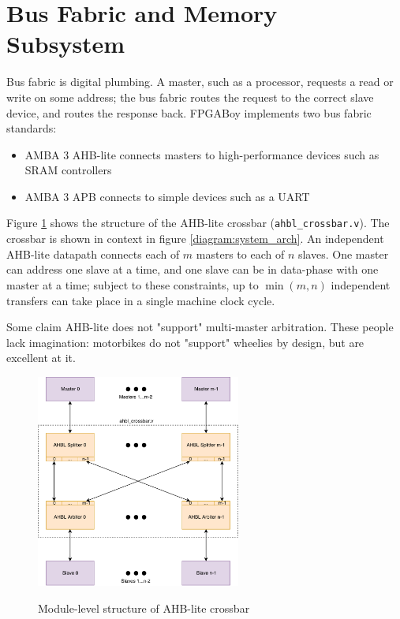 \documentclass{article}
\begin{document}
\section{Bus Fabric and Memory Subsystem}

Bus fabric is digital plumbing. A master, such as a processor, requests a read or write on some address; the bus fabric routes the request to the correct slave device, and routes the response back. FPGABoy implements two bus fabric standards:

\begin{itemize}
\item AMBA 3 AHB-lite connects masters to high-performance devices such as SRAM controllers
\item AMBA 3 APB connects to simple devices such as a UART
\end{itemize}

Figure \ref{diagram:crossbar_structure} shows the structure of the AHB-lite crossbar (\texttt{ahbl\_crossbar.v}). The crossbar is shown in context in figure \ref{diagram:system_arch}. An independent AHB-lite datapath connects each of $m$ masters to each of $n$ slaves. One master can address one slave at a time, and one slave can be in data-phase with one master at a time; subject to these constraints, up to $\min(m,n)$ independent transfers can take place in a single machine clock cycle.

Some claim AHB-lite does not "support" multi-master arbitration. These people lack imagination: motorbikes do not "support" wheelies by design, but are excellent at it.

\begin{figure}[!htb]
\centering
\caption{Module-level structure of AHB-lite crossbar} \includegraphics[width=0.6\textwidth]{diagrams/crossbar_structure.pdf}
\label{diagram:crossbar_structure}
\end{figure}
\end{document}
